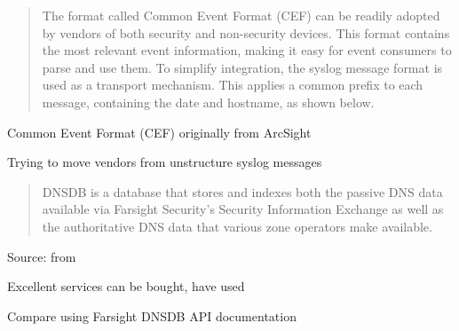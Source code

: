 \documentclass[Screen16to9,17pt]{foils}
\begin{document}


\begin{quote}
  The format called Common Event Format (CEF) can be readily adopted by
  vendors of both security and non-security devices. This format contains the
  most relevant event information, making it easy for event consumers to parse
  and use them.
  To simplify integration, the syslog message format is used as a transport
  mechanism. This applies a common prefix to each message, containing the
  date and hostname, as shown below.
\end{quote}

\begin{list2}
\item Common Event Format (CEF) originally from ArcSight
\item Trying to move vendors from unstructure syslog messages
\item {}
\end{list2}







\begin{quote}
DNSDB is a database that stores and indexes both the passive DNS data available via Farsight Security’s Security Information Exchange as well as the authoritative DNS data that various zone operators make available.
\end{quote}
Source: from 
\begin{list2}
  \item Excellent services can be bought, have used 
\item Compare using 
  Farsight DNSDB API documentation
\item {}

\end{list2}


\end{document}
